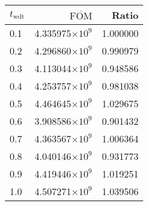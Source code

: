 \begin{tabular}{lrr}
\toprule
$t_{\mathrm{wdt}}$ & $\overline{\mathrm{FOM}}$ &    Ratio \\
\midrule
               0.1 &   4.335975$\times 10^{9}$ & 1.000000 \\
               0.2 &   4.296860$\times 10^{9}$ & 0.990979 \\
               0.3 &   4.113044$\times 10^{9}$ & 0.948586 \\
               0.4 &   4.253757$\times 10^{9}$ & 0.981038 \\
               0.5 &   4.464645$\times 10^{9}$ & 1.029675 \\
               0.6 &   3.908586$\times 10^{9}$ & 0.901432 \\
               0.7 &   4.363567$\times 10^{9}$ & 1.006364 \\
               0.8 &   4.040146$\times 10^{9}$ & 0.931773 \\
               0.9 &   4.419446$\times 10^{9}$ & 1.019251 \\
               1.0 &   4.507271$\times 10^{9}$ & 1.039506 \\
\bottomrule
\end{tabular}
